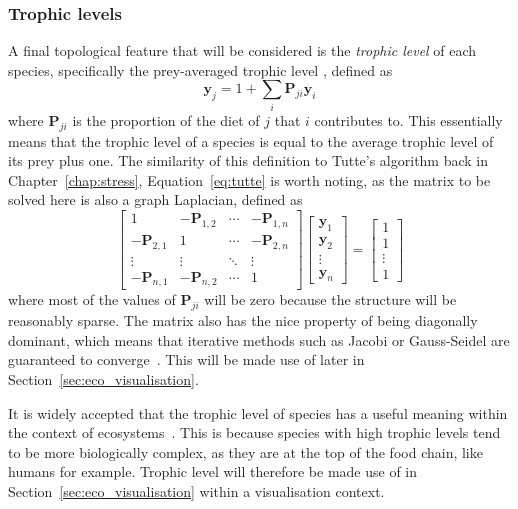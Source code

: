 \subsubsection{Trophic levels}
A final topological feature that will be considered is the \emph{trophic level} of each species, specifically the prey-averaged trophic level \cite{Williams2004}, defined as
\begin{equation}
  \mathbf{y}_j = 1 + \sum_i \mathbf{P}_{ji}\mathbf{y}_i
  \label{eq:trophic}
\end{equation}
where $\mathbf{P}_{ji}$ is the proportion of the diet of $j$ that $i$ contributes to.
This essentially means that the trophic level of a species is equal to the average trophic level of its prey plus one.
The similarity of this definition to Tutte's algorithm back in Chapter~\ref{chap:stress}, Equation~\eqref{eq:tutte} is worth noting, as the matrix to be solved here is also a graph Laplacian, defined as
\begin{equation}
  \begin{bmatrix}
  1&-\mathbf{P}_{1,2}&\cdots&-\mathbf{P}_{1,n}\\
  -\mathbf{P}_{2,1}&1&\cdots&-\mathbf{P}_{2,n}\\
  \vdots&\vdots&\ddots&\vdots\\
  -\mathbf{P}_{n,1}&-\mathbf{P}_{n,2}&\cdots&1
  \end{bmatrix}
  \begin{bmatrix}
  \mathbf{y}_1\\\mathbf{y}_2\\\vdots\\\mathbf{y}_n
  \end{bmatrix}
  =
  \begin{bmatrix}
  1\\1\\\vdots\\1
  \end{bmatrix}
  \label{eq:trophic_matrix}
\end{equation}
where most of the values of $\mathbf{P}_{ji}$ will be zero because the structure will be reasonably sparse.
The matrix also has the nice property of being diagonally dominant, which means that iterative methods such as Jacobi or Gauss-Seidel are guaranteed to converge~\cite{Young2014}. This will be made use of later in Section~\ref{sec:eco_visualisation}.

It is widely accepted that the trophic level of species has a useful meaning within the context of ecosystems~\cite{Post2002, Johnson2014}. This is because species with high trophic levels tend to be more biologically complex, as they are at the top of the food chain, like humans for example. Trophic level will therefore be made use of in Section~\ref{sec:eco_visualisation} within a visualisation context.

